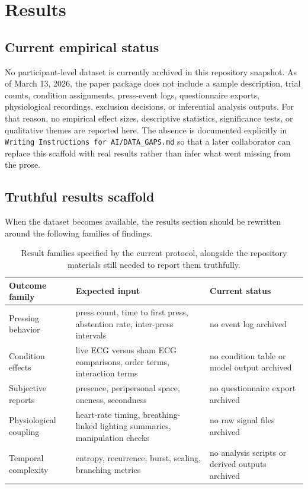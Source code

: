 \section{Results}

\subsection{Current empirical status}

No participant-level dataset is currently archived in this repository snapshot. As of March 13, 2026, the paper package does not include a sample description, trial counts, condition assignments, press-event logs, questionnaire exports, physiological recordings, exclusion decisions, or inferential analysis outputs. For that reason, no empirical effect sizes, descriptive statistics, significance tests, or qualitative themes are reported here. The absence is documented explicitly in \texttt{Writing Instructions for AI/DATA\_GAPS.md} so that a later collaborator can replace this scaffold with real results rather than infer what went missing from the prose.

\subsection{Truthful results scaffold}

When the dataset becomes available, the results section should be rewritten around the following families of findings.

\begin{table}[t]
\centering
\begin{tabular}{|p{3.3cm}|p{4.6cm}|p{5.2cm}|}
\hline
\textbf{Outcome family} & \textbf{Expected input} & \textbf{Current status} \\
\hline
Pressing behavior & press count, time to first press, abstention rate, inter-press intervals & no event log archived \\
\hline
Condition effects & live ECG versus sham ECG comparisons, order terms, interaction terms & no condition table or model output archived \\
\hline
Subjective reports & presence, peripersonal space, oneness, secondness & no questionnaire export archived \\
\hline
Physiological coupling & heart-rate timing, breathing-linked lighting summaries, manipulation checks & no raw signal files archived \\
\hline
Temporal complexity & entropy, recurrence, burst, scaling, branching metrics & no analysis scripts or derived outputs archived \\
\hline
\end{tabular}
\caption{Result families specified by the current protocol, alongside the repository materials still needed to report them truthfully.}
\end{table}

